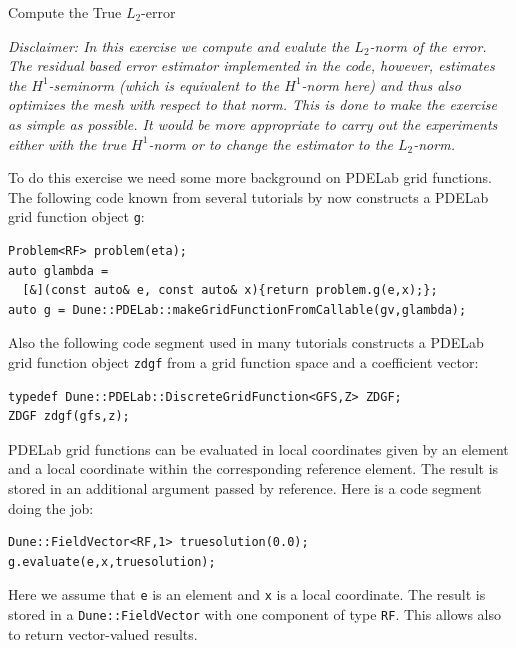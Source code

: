\documentclass[12pt,a4paper]{article}
\begin{document}
\begin{Exercise}{Compute the True $L_2$-error}

\textit{Disclaimer: In this exercise we compute and evalute the $L_2$-norm
of the error. The residual based error estimator implemented in the
code, however, estimates the $H^1$-seminorm (which is equivalent to the $H^1$-norm here)
and thus also optimizes the mesh with respect to that norm.
This is done to make the exercise as simple as possible. It would be more appropriate
to carry out the experiments either with the true $H^1$-norm or to change the estimator
to the $L_2$-norm.}

To do this exercise we need some more background on PDELab grid functions.
The following code known from several tutorials by now
constructs a PDELab grid function object \lstinline{g}:
\begin{lstlisting}[basicstyle=\ttfamily\small,
frame=single,
backgroundcolor=\color{listingbg}]
Problem<RF> problem(eta);
auto glambda =
  [&](const auto& e, const auto& x){return problem.g(e,x);};
auto g = Dune::PDELab::makeGridFunctionFromCallable(gv,glambda);
\end{lstlisting}
Also the following code segment used in many tutorials constructs
a PDELab grid function object \lstinline{zdgf} from a grid function space and
a coefficient vector:
\begin{lstlisting}[basicstyle=\ttfamily\small,
frame=single,
backgroundcolor=\color{listingbg}]
typedef Dune::PDELab::DiscreteGridFunction<GFS,Z> ZDGF;
ZDGF zdgf(gfs,z);
\end{lstlisting}
PDELab grid functions can be evaluated in local coordinates given by an
element and a local coordinate within the corresponding reference element.
The result is stored in an additional argument passed by reference.
Here is a code segment doing the job:
\begin{lstlisting}[basicstyle=\ttfamily\small,
frame=single,
backgroundcolor=\color{listingbg}]
Dune::FieldVector<RF,1> truesolution(0.0);
g.evaluate(e,x,truesolution);
\end{lstlisting}
Here we assume that \lstinline{e} is an element and \lstinline{x} is a local coordinate.
The result is stored in a \lstinline{Dune::FieldVector} with one component of type
\lstinline{RF}. This allows also to return vector-valued results.


\end{Exercise}
\end{document}
